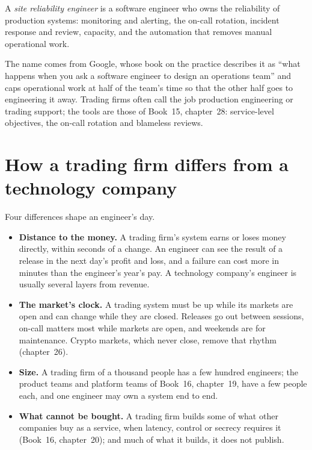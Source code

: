 \begin{definition}\label{def:in:software-engineer:sre}
A \emph{site reliability engineer} is a software engineer who owns the reliability of
production systems: monitoring and alerting, the on-call rotation, incident response and review, capacity, and the
automation that removes manual operational work.
\end{definition}

The name comes from Google, whose book on the practice describes it as ``what happens when you ask a software engineer to
design an operations team'' and caps operational work at half of the team's time so that the other half goes to
engineering it away. Trading firms often call the job production engineering or trading support; the tools are those of
Book~15, chapter~28: service-level objectives, the on-call rotation and blameless reviews.

\section{How a trading firm differs from a technology company}

Four differences shape an engineer's day.
\begin{itemize}
\item \textbf{Distance to the money.} A trading firm's system earns or loses money directly, within seconds of a change.
An engineer can see the result of a release in the next day's profit and loss, and a failure can cost more in minutes
than the engineer's year's pay. A technology company's engineer is usually several layers from revenue.
\item \textbf{The market's clock.} A trading system must be up while its markets are open and can change while they are
closed. Releases go out between sessions, on-call matters most while markets are open, and weekends are for maintenance.
Crypto markets, which never close, remove that rhythm (chapter~26).
\item \textbf{Size.} A trading firm of a thousand people has a few hundred engineers; the product teams and platform teams
of Book~16, chapter~19, have a few people each, and one engineer may own a system end to end.
\item \textbf{What cannot be bought.} A trading firm builds some of what other companies buy as a service, when latency,
control or secrecy requires it (Book~16, chapter~20); and much of what it builds, it does not publish.
\end{itemize}

